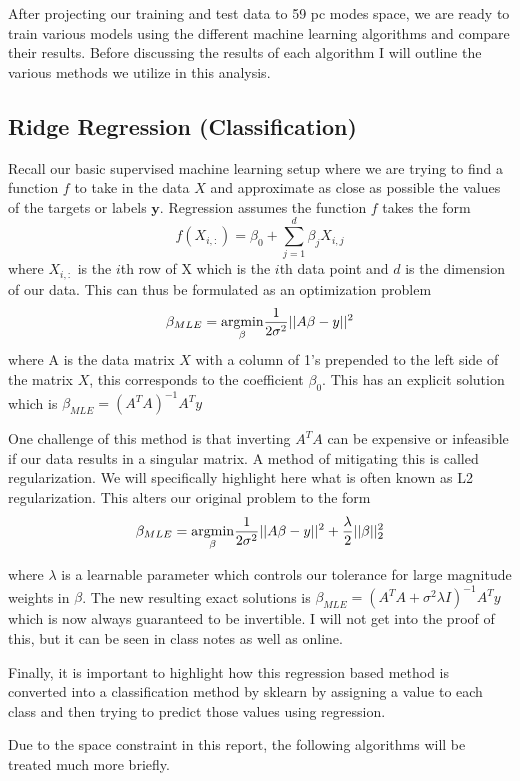 \documentclass[11pt]{amsart}
\begin{document}
After projecting our training and test data to 59 pc modes space, we are ready to train various models using the different machine learning algorithms and compare their results.
Before discussing the results of each algorithm I will outline the various methods we utilize in this analysis.

\subsection{Ridge Regression (Classification)}
Recall our basic supervised machine learning setup where we are trying to find a function $f$ to take in the data $X$ and approximate as close as possible the values of the targets or labels $\bm y$.
Regression assumes the function $f$ takes the form 
$$f(X_{i,:}) = \beta_0 + \sum_{j=1}^d \beta_j X_{i,j}$$
where $X_{i,:}$ is the $i$th row of X which is the $i$th data point and $d$ is the dimension of our data.
This can thus be formulated as an optimization problem
$$ \beta_{MLE} = \underset{ \beta} {\rm argmin} \frac 1 {2 \sigma^2} || A\beta - y||^2$$
where A is the data matrix $X$ with a column of 1's prepended to the left side of the matrix $X$, this corresponds to the coefficient $\beta_0$.
This has an explicit solution which is $\beta_{MLE} = (A^TA)^{-1}A^Ty$

One challenge of this method is that inverting $A^TA$ can be expensive or infeasible if our data results in a singular matrix.
A method of mitigating this is called regularization.
We will specifically highlight here what is often known as L2 regularization.
This alters our original problem to the form
$$ \beta_{MLE} = \underset{ \beta} {\rm argmin} \frac 1 {2 \sigma^2} || A\beta - y||^2 + \frac \lambda 2 ||\beta||_2^2$$

where $\lambda$ is a learnable parameter which controls our tolerance for large magnitude weights in $\beta$.
The new resulting exact solutions is $\beta_{MLE} = (A^TA + \sigma^2\lambda I)^{-1}A^Ty$ which is now always guaranteed to be invertible.
I will not get into the proof of this, but it can be seen in class notes as well as online.

Finally, it is important to highlight how this regression based method is converted into a classification method by sklearn by assigning a value to each class and then trying to predict those values using regression.

Due to the space constraint in this report, the following algorithms will be treated much more briefly.
\end{document}
